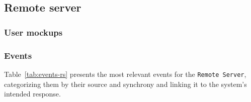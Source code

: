 %
\subsection{Remote server}
\label{sec:remote-serv-decomp}

\subsubsection{User mockups}
\label{sec:user-mockups-2}

\subsubsection{Events}
\label{sec:events-2}
%
Table~\ref{tab:events-rs} presents the most relevant events for the
\texttt{Remote Server}, categorizing them by their source and synchrony and
linking it to the system's intended response.

